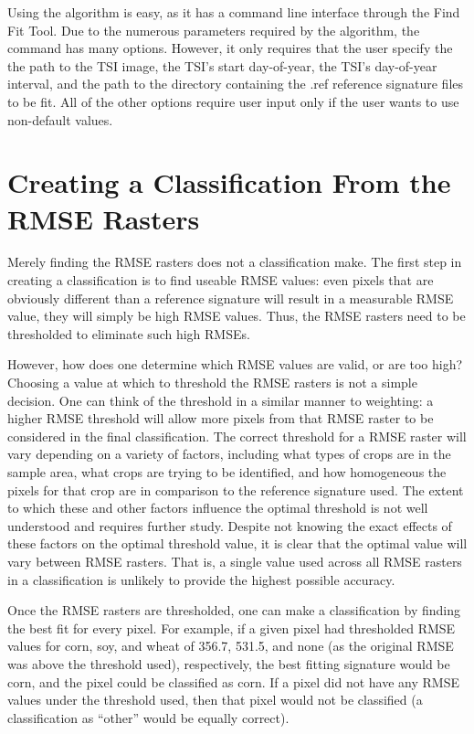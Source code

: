 Using the algorithm is easy, as it has a command line interface through the Find Fit Tool. Due to the numerous parameters required by the algorithm, the command has many options. However, it only requires that the user specify the the path to the TSI image, the TSI's start day-of-year, the TSI's day-of-year interval, and the path to the directory containing the .ref reference signature files to be fit. All of the other options require user input only if the user wants to use non-default values.


\section{Creating a Classification From the RMSE Rasters}
\label{appendix:tools:classify}

Merely finding the RMSE rasters does not a classification make. The first step in creating a classification is to find useable RMSE values: even pixels that are obviously different than a reference signature will result in a measurable RMSE value, they will simply be high RMSE values. Thus, the RMSE rasters need to be thresholded to eliminate such high RMSEs.

However, how does one determine which RMSE values are valid, or are too high? Choosing a value at which to threshold the RMSE rasters is not a simple decision. One can think of the threshold in a similar manner to weighting: a higher RMSE threshold will allow more pixels from that RMSE raster to be considered in the final classification. The correct threshold for a RMSE raster will vary depending on a variety of factors, including what types of crops are in the sample area, what crops are trying to be identified, and how homogeneous the pixels for that crop are in comparison to the reference signature used. The extent to which these and other factors influence the optimal threshold is not well understood and requires further study. Despite not knowing the exact effects of these factors on the optimal threshold value, it is clear that the optimal value will vary between RMSE rasters. That is, a single value used across all RMSE rasters in a classification is unlikely to provide the highest possible accuracy.

Once the RMSE rasters are thresholded, one can make a classification by finding the best fit for every pixel. For example, if a given pixel had thresholded RMSE values for corn, soy, and wheat of 356.7, 531.5, and none (as the original RMSE was above the threshold used), respectively, the best fitting signature would be corn, and the pixel could be classified as corn. If a pixel did not have any RMSE values under the threshold used, then that pixel would not be classified (a classification as ``other'' would be equally correct).

